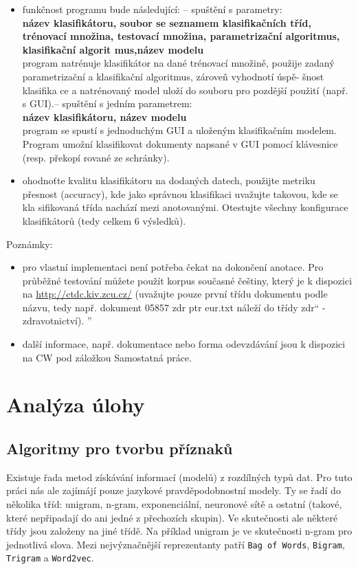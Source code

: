 \documentclass[12pt]{article}
\begin{document}
\begin{itemize}
\item funkčnost programu bude následující:
– spuštění s parametry:\\
\textbf{název klasifikátoru, soubor se seznamem klasifikačních tříd, trénovací množina, testovací množina, parametrizační algoritmus, klasifikační algorit    mus,název modelu}\\
program natrénuje klasifikátor na dané trénovací množině, použije zadaný parametrizační a klasifikační algoritmus, zároveň vyhodnotí úspě- šnost klasifika    ce a natrénovaný model uloží do souboru pro pozdější použití (např. s GUI).– spuštění s jedním parametrem:\\
\textbf{název klasifikátoru, název modelu} \\
program se spustí s jednoduchým GUI a uloženým klasifikačním modelem. Program umožní klasifikovat dokumenty napsané v GUI pomocí klávesnice (resp. překopí    rované ze schránky).

\item ohodnoťte kvalitu klasifikátoru na dodaných datech, použijte metriku přesnost (accuracy), kde jako správnou klasifikaci uvažujte takovou, kde se kla    sifikovaná třída nachází mezi anotovanými. Otestujte všechny konfigurace klasifikátorů (tedy celkem 6 výsledků).
\end{itemize}


Poznámky:
\begin{itemize}
\item pro vlastní implementaci není potřeba čekat na dokončení anotace. Pro průběžné testování můžete použít korpus současné češtiny, který je k dispozici     na \url{http://ctdc.kiv.zcu.cz/} (uvažujte pouze první třídu dokumentu podle názvu, tedy např.
dokument 05857 zdr ptr eur.txt náleží do třídy zdr“ - zdravotnictví).
”
\item další informace, např. dokumentace nebo forma odevzdávání jsou k dispozici na CW pod záložkou Samostatná práce.

\end{itemize}
%
%
\pagebreak
%
\section{Analýza úlohy}
\subsection{Algoritmy pro tvorbu příznaků}
Existuje řada metod získávání informací (modelů) z rozdílných typů dat.
Pro tuto
práci nás ale zajímájí pouze jazykové pravděpodobnostní modely. Ty se
řadí do několika tříd: unigram, n-gram, exponenciální, neuronové sítě
a ostatní (takové, které nepřipadají do ani jedné z přechozích skupin).
Ve skutečnosti ale některé třídy jsou založeny na jiné třídě. Na
příklad unigram je ve skutečnosti n-gram pro jednotlivá slova. Mezi
nejvýznačnější reprezentanty patří \texttt{Bag of Words},
\texttt{Bigram}, \texttt{Trigram} a \texttt{Word2vec}.
\end{document}
